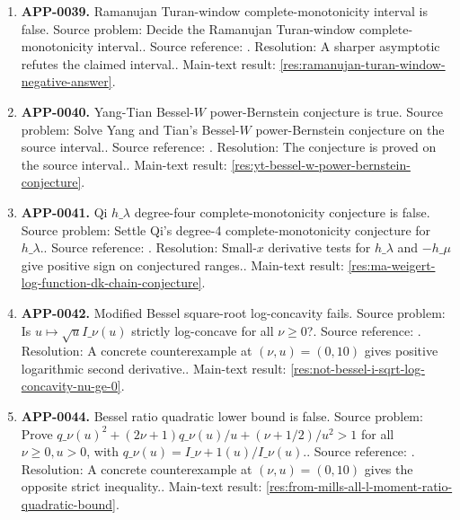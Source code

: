 \begin{enumerate}[leftmargin=*]
\item \textbf{APP-0039.} Ramanujan Turan-window complete-monotonicity interval is false.  Source problem: Decide the Ramanujan Turan-window complete-monotonicity interval.. Source reference: \cite{app-app-0039-source}. Resolution: A sharper asymptotic refutes the claimed interval.. Main-text result: \ref{res:ramanujan-turan-window-negative-answer}.
\item \textbf{APP-0040.} Yang-Tian Bessel-\(W\) power-Bernstein conjecture is true.  Source problem: Solve Yang and Tian's Bessel-\(W\) power-Bernstein conjecture on the source interval.. Source reference: \cite{app-app-0040-source}. Resolution: The conjecture is proved on the source interval.. Main-text result: \ref{res:yt-bessel-w-power-bernstein-conjecture}.
\item \textbf{APP-0041.} Qi \(h\_\lambda\) degree-four complete-monotonicity conjecture is false.  Source problem: Settle Qi's degree-4 complete-monotonicity conjecture for \(h\_\lambda\).. Source reference: \cite{app-app-0041-source}. Resolution: Small-\(x\) derivative tests for \(h\_\lambda\) and \(-h\_\mu\) give positive sign on conjectured ranges.. Main-text result: \ref{res:ma-weigert-log-function-dk-chain-conjecture}.
\item \textbf{APP-0042.} Modified Bessel square-root log-concavity fails.  Source problem: Is \(u\mapsto \sqrt{u}I\_\nu(u)\) strictly log-concave for all \(\nu\ge0\)?. Source reference: \cite{app-app-0042-source}. Resolution: A concrete counterexample at \((\nu,u)=(0,10)\) gives positive logarithmic second derivative.. Main-text result: \ref{res:not-bessel-i-sqrt-log-concavity-nu-ge-0}.
\item \textbf{APP-0044.} Bessel ratio quadratic lower bound is false.  Source problem: Prove \(q\_\nu(u)^2+(2\nu+1)q\_\nu(u)/u+(\nu+1/2)/u^2>1\) for all \(\nu\ge0,u>0\), with \(q\_\nu(u)=I\_{\nu+1}(u)/I\_\nu(u)\).. Source reference: \cite{app-app-0044-source}. Resolution: A concrete counterexample at \((\nu,u)=(0,10)\) gives the opposite strict inequality.. Main-text result: \ref{res:from-mills-all-l-moment-ratio-quadratic-bound}.
\end{enumerate}
